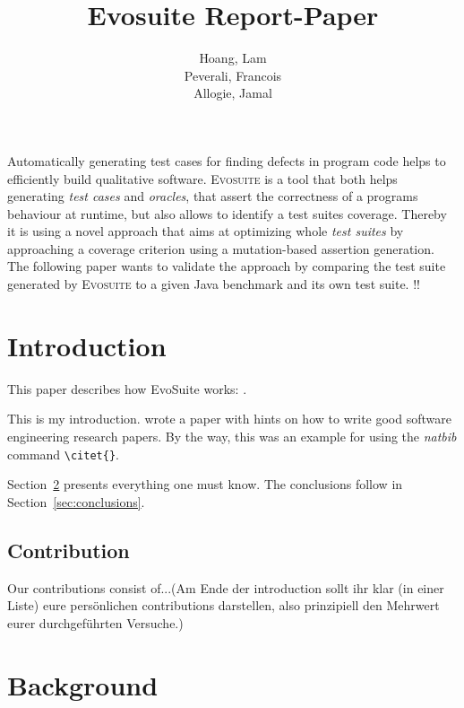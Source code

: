 \documentclass[pdftex,english,oribibl]{llncs}
\title{Evosuite Report-Paper}
\author{Hoang, Lam\\ Peverali, Francois \\ Allogie, Jamal}
\institute{Humboldt University of Berlin\\Department of Computer Science\\12489 Berlin, Germany}
\makeatletter
\gdef\@keywords{}
\renewenvironment{abstract}{%
  \list{}{\advance\topsep by0.35cm\relax\small%
          \leftmargin=1cm%
          \labelwidth=\z@%
          \listparindent=\z@%
          \itemindent\listparindent%
          \rightmargin\leftmargin}%
          \item[\hskip\labelsep\bfseries\abstractname]}{%
  \if!\@keywords!\else{\item[~]\item[\hskip\labelsep\bfseries\keywordname]\@keywords}\fi%
  \endlist}
\makeatother
\begin{document}
\maketitle

\begin{abstract}
  Automatically generating test cases for finding defects in program code helps to efficiently build qualitative software. \textsc{Evosuite} is a tool that both helps generating \textit{test cases} and \textit{oracles}, that assert the correctness of a programs behaviour at runtime, but also allows to identify a test suites coverage. Thereby it is using a novel approach that aims at optimizing whole \textit{test suites} by approaching a coverage criterion using a mutation-based assertion generation. The following paper wants to validate the approach by comparing the test suite generated by \textsc{Evosuite}  to a given Java benchmark and its own test suite.
\end{abstract}

\section{Introduction}

This paper describes how EvoSuite works: \citet{fraser2011evosuite}.

This is my introduction. \citet{Shaw2003WritingGoodSoftwareEngineeringResearchPapersMinitutorial} wrote a paper with hints on how to write good software engineering research papers. By the way, this was an example for using the \textit{natbib} command \texttt{\textbackslash{}citet\{\}}.

  Section~\ref{sec:anotherSection} presents everything one must know. The conclusions follow in Section~\ref{sec:conclusions}.

\subsection{Contribution}

Our contributions consist of...(Am Ende der introduction sollt ihr klar (in einer Liste) eure persönlichen contributions darstellen, also prinzipiell den Mehrwert eurer durchgeführten Versuche.)


\section{Background}\label{sec:anotherSection}
\end{document}

